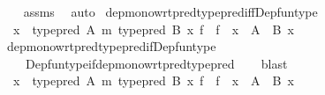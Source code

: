 \begin{isabellebody}
%
\isadelimproof
\ \ %
\endisadelimproof
%
\isatagproof
{}\isamarkupfalse%
\ assms\ \isamarkupfalse%
\ auto%
\endisatagproof
{\isafoldproof}%
%
\isadelimproof
\isanewline
%
\endisadelimproof
\isanewline
{}\isamarkupfalse%
\ dep{\isacharunderscore}{\kern0pt}mono{\isacharunderscore}{\kern0pt}wrt{\isacharunderscore}{\kern0pt}pred{\isacharunderscore}{\kern0pt}type{\isacharunderscore}{\kern0pt}pred{\isacharunderscore}{\kern0pt}iff{\isacharunderscore}{\kern0pt}Dep{\isacharunderscore}{\kern0pt}fun{\isacharunderscore}{\kern0pt}type{\isacharcolon}{\kern0pt}\isanewline
\ \ {\isachardoublequoteopen}{\isacharparenleft}{\kern0pt}{\isacharbrackleft}{\kern0pt}x\ {\isasymColon}\ type{\isacharunderscore}{\kern0pt}pred\ A{\isacharbrackright}{\kern0pt}\ {\isasymRrightarrow}\isactrlsub m\ type{\isacharunderscore}{\kern0pt}pred\ {\isacharparenleft}{\kern0pt}B\ x{\isacharparenright}{\kern0pt}{\isacharparenright}{\kern0pt}\ f\ {\isasymlongleftrightarrow}\ f\ {\isacharcolon}{\kern0pt}\ {\isacharparenleft}{\kern0pt}x\ {\isacharcolon}{\kern0pt}\ A{\isacharparenright}{\kern0pt}\ {\isasymRightarrow}\ B\ x{\isachardoublequoteclose}\isanewline
%
\isadelimproof
\ \ %
\endisadelimproof
%
\isatagproof
{}\isamarkupfalse%
\ dep{\isacharunderscore}{\kern0pt}mono{\isacharunderscore}{\kern0pt}wrt{\isacharunderscore}{\kern0pt}pred{\isacharunderscore}{\kern0pt}type{\isacharunderscore}{\kern0pt}pred{\isacharunderscore}{\kern0pt}if{\isacharunderscore}{\kern0pt}Dep{\isacharunderscore}{\kern0pt}fun{\isacharunderscore}{\kern0pt}type\isanewline
\ \ \ \ Dep{\isacharunderscore}{\kern0pt}fun{\isacharunderscore}{\kern0pt}type{\isacharunderscore}{\kern0pt}if{\isacharunderscore}{\kern0pt}dep{\isacharunderscore}{\kern0pt}mono{\isacharunderscore}{\kern0pt}wrt{\isacharunderscore}{\kern0pt}pred{\isacharunderscore}{\kern0pt}type{\isacharunderscore}{\kern0pt}pred\isanewline
\ \ \isamarkupfalse%
\ blast%
\endisatagproof
{\isafoldproof}%
%
\isadelimproof
\isanewline
%
\endisadelimproof
\isanewline
{}\isamarkupfalse%
\isanewline
\ \ {\isachardoublequoteopen}{\isacharparenleft}{\kern0pt}{\isacharbrackleft}{\kern0pt}x\ {\isasymColon}\ type{\isacharunderscore}{\kern0pt}pred\ A{\isacharbrackright}{\kern0pt}\ {\isasymRrightarrow}\isactrlsub m\ type{\isacharunderscore}{\kern0pt}pred\ {\isacharparenleft}{\kern0pt}B\ x{\isacharparenright}{\kern0pt}{\isacharparenright}{\kern0pt}\ f{\isachardoublequoteclose}\ {\isasymrightleftharpoons}\ {\isachardoublequoteopen}f\ {\isacharcolon}{\kern0pt}\ {\isacharparenleft}{\kern0pt}x\ {\isacharcolon}{\kern0pt}\ A{\isacharparenright}{\kern0pt}\ {\isasymRightarrow}\ B\ x{\isachardoublequoteclose}\isanewline

\end{isabellebody}
